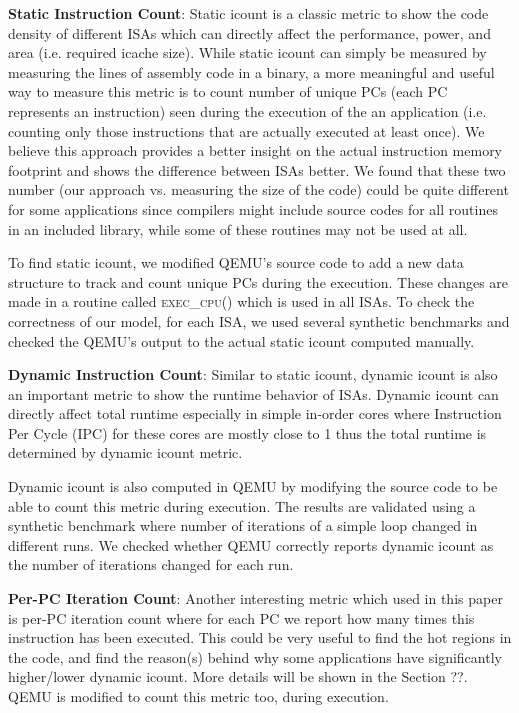 \noindent \textbf{Static Instruction Count}: Static icount is a classic metric to show the code density of different ISAs which can directly affect the performance, power, and area (i.e. required icache size). While static icount can simply be measured by measuring the lines of assembly code in a binary, a more meaningful and useful way to measure this metric is to count number of unique PCs (each PC represents an instruction) seen during the execution of the an application (i.e. counting only those instructions that are actually executed at least once). We believe this approach provides a better insight on the actual instruction memory footprint and shows the difference between ISAs better. We found that these two number (our approach vs. measuring the size of the code) could be quite different for some applications since compilers might include source codes for all routines in an included library, while some of these routines may not be used at all.  

To find static icount, we modified QEMU's source code to add a new data structure to track and count unique PCs during the execution. These changes are made in a routine called \textsc{exec\_cpu()} which is used in all ISAs. To check the correctness of our model, for each ISA, we used several synthetic benchmarks and checked the QEMU's output to the actual static icount computed manually. 

\noindent \textbf{Dynamic Instruction Count}: Similar to static icount, dynamic icount is also an important metric to show the runtime behavior of ISAs. Dynamic icount can directly affect total runtime especially in simple in-order cores where Instruction Per Cycle (IPC) for these cores are mostly close to 1 thus the total runtime is determined by dynamic icount metric. 

Dynamic icount is also computed in QEMU by modifying the source code to be able to count this metric during execution. The results are validated using a synthetic benchmark where number of iterations of a simple loop changed in different runs. We checked whether QEMU correctly reports dynamic icount as the number of iterations changed for each run. 

\noindent \textbf{Per-PC Iteration Count}: Another interesting metric which used in this paper is per-PC iteration count where for each PC we report how many times this instruction has been executed. This could be very useful to find the hot regions in the code, and find the reason(s) behind why some applications have significantly higher/lower dynamic icount. More details will be shown in the Section ??. QEMU is modified to count this metric too, during execution. 

